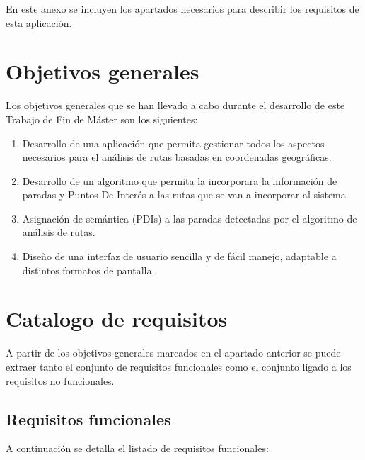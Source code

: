 En este anexo se incluyen los apartados necesarios para describir los requisitos de esta aplicación.

\section{Objetivos generales}

Los objetivos generales que se han llevado a cabo durante el desarrollo de este Trabajo de Fin de Máster son los siguientes:

\begin{enumerate}
	\item Desarrollo de una aplicación que permita gestionar todos los aspectos necesarios para el análisis de rutas basadas en coordenadas geográficas.
	\item Desarrollo de un algoritmo que permita la incorporara la información de paradas y Puntos De Interés a las rutas que se van a incorporar al sistema.
	\item Asignación de semántica (PDIs) a las paradas detectadas por el algoritmo de análisis de rutas.
	\item Diseño de una interfaz de usuario sencilla y de fácil manejo, adaptable a distintos formatos de pantalla.
\end{enumerate}

\section{Catalogo de requisitos}
A partir de los objetivos generales marcados en el apartado anterior se puede extraer tanto el conjunto de requisitos funcionales como el conjunto ligado a los requisitos no funcionales.

\subsection{Requisitos funcionales}
A continuación se detalla el listado de requisitos funcionales:

